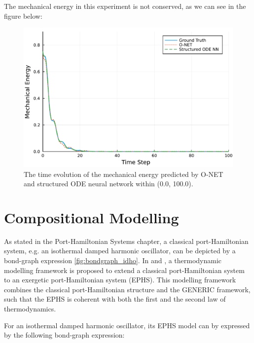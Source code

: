 \documentclass[
	parskip, 			   %
	twoside, 			   %
	DIV=14, 			   %
	BCOR=15.0mm, 		   %
	headsepline, 		   %
	open=right, 		   %
	captions=tableheading, %
	bibliography=totoc,    %
	numbers=noenddot       %
]{scrreprt}
\begin{document}
The mechanical energy in this experiment is not conserved, as we can see in the figure below:

\clearpage
\begin{figure}[h!]
    \centering
    \includegraphics[scale=0.5]{figures/Hamiltonian_evolution_idho_O_NET_and_structured_ODE_NN.pdf}
    \caption{The time evolution of the mechanical energy predicted by O-NET and structured ODE neural network within (0.0, 100.0).}
    \label{fig:Hamiltonian_evolution_idho_O_NET_and_structured_ODE_NN}
\end{figure}


\clearpage
\chapter{Compositional Modelling}
\label{ch:chapter7}

As stated in the Port-Hamiltonian Systems chapter, a classical port-Hamiltonian system, e.g. an isothermal damped harmonic oscillator, can be depicted by a bond-graph expression \ref{fig:bondgraph_idho}. In \cite{lohmayer2022exergetic} and \cite{lohmayer2022ephs}, a thermodynamic modelling framework is proposed to extend a classical port-Hamiltonian system to an exergetic port-Hamiltonian system (EPHS). This modelling framework combines the classical port-Hamiltonian structure and the GENERIC framework, such that the EPHS is coherent with both the first and the second law of thermodynamics.

For an isothermal damped harmonic oscillator, its EPHS model can by expressed by the following bond-graph expression:
\end{document}
